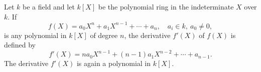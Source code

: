Let $k$ be a field and let $k[X]$ be the polynomial ring in the indeterminate $X$ over $k$. If
$$f(X) = a_0 X^n + a_1 X^{n-1} + \cdots + a_n, \quad a_i \in k,\ a_0 \neq 0,$$
is any polynomial in $k[X]$ of degree $n$, the derivative $f'(X)$ of $f(X)$ is defined by
$$f'(X) = n a_0 X^{n-1} + (n-1) a_1 X^{n-2} + \cdots + a_{n-1}.$$
The derivative $f'(X)$ is again a polynomial in $k[X]$.
